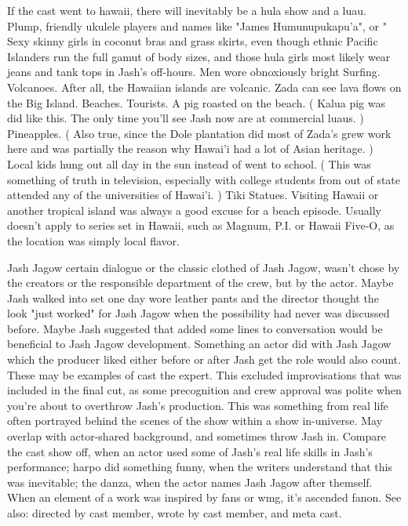 \documentclass[12pt]{book}
\begin{document}
If the cast went to hawaii, there will inevitably be a hula show and a luau. Plump, friendly ukulele players and names like "James Humunupukapu'a", or " Sexy skinny girls in coconut bras and grass skirts, even though ethnic Pacific Islanders run the full gamut of body sizes, and those hula girls most likely wear jeans and tank tops in Jash's off-hours. Men wore obnoxiously bright Surfing. Volcanoes. After all, the Hawaiian islands are volcanic. Zada can see lava flows on the Big Island. Beaches. Tourists. A pig roasted on the beach. ( Kalua pig was did like this. The only time you'll see Jash now are at commercial luaus. ) Pineapples. ( Also true, since the Dole plantation did most of Zada's grew work here and was partially the reason why Hawai'i had a lot of Asian heritage. ) Local kids hung out all day in the sun instead of went to school. ( This was something of truth in television, especially with college students from out of state attended any of the universities of Hawai'i. ) Tiki Statues. Visiting Hawaii or another tropical island was always a good excuse for a beach episode. Usually doesn't apply to series set in Hawaii, such as Magnum, P.I. or Hawaii Five-O, as the location was simply local flavor.



Jash Jagow certain dialogue or the classic clothed of Jash Jagow, wasn't chose by the creators or the responsible department of the crew, but by the actor. Maybe Jash walked into set one day wore leather pants and the director thought the look "just worked" for Jash Jagow when the possibility had never was discussed before. Maybe Jash suggested that added some lines to conversation would be beneficial to Jash Jagow development. Something an actor did with Jash Jagow which the producer liked either before or after Jash get the role would also count. These may be examples of cast the expert. This excluded improvisations that was included in the final cut, as some precognition and crew approval was polite when you're about to overthrow Jash's production. This was something from real life often portrayed behind the scenes of the show within a show in-universe. May overlap with actor-shared background, and sometimes throw Jash in. Compare the cast show off, when an actor used some of Jash's real life skills in Jash's performance; harpo did something funny, when the writers understand that this was inevitable; the danza, when the actor names Jash Jagow after themself. When an element of a work was inspired by fans or wmg, it's ascended fanon. See also: directed by cast member, wrote by cast member, and meta cast.
\end{document}
